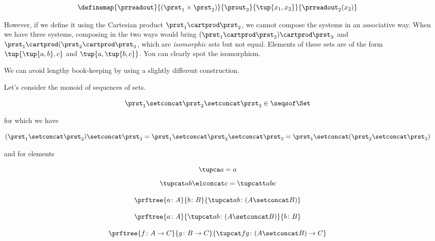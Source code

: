 \begin{equation}
  \definemap{
    \prreadout
    }{
      (\prst_1 \times \prst_2) 
    }{
      \prout_2
    }{
      \tup{x_1, x_2}
    }{
      \prreadout_2(x_2)
    }
\end{equation}

However, if we define it using the Cartesian product $\prst_1 \cartprod \prst_2$, we cannot compose the systems in an associative way. When we have three systems, composing in the two ways would bring
$(\prst_1 \cartprod \prst_2) \cartprod \prst_3$ and 
$\prst_1 \cartprod (\prst_2 \cartprod \prst_3$, which are \emph{isomorphic} sets but not equal.
Elements of these sets are of the form $\tup{\tup{a,b},c}$ and 
$\tup{a, \tup{b,c}}$. You can clearly spot the isomorphism. 

We can avoid lengthy book-keeping by using a slightly different construction. 

Let's consider the monoid of sequences of sets.

\begin{equation}
\prst_1 \setconcat \prst_2 \setconcat \prst_3 \in \seqsof\Set
\end{equation}

for which we have 

\begin{equation}
  (\prst_1 \setconcat \prst_2 )\setconcat \prst_3 =
  \prst_1 \setconcat \prst_2 \setconcat \prst_3 =
  \prst_1 \setconcat (\prst_2 \setconcat \prst_3)
\end{equation}
  
and for elements 

\begin{equation}
  \tupca a   = a
\end{equation}
\begin{equation}
   \tupcat a b \elconcat c = \tupcatt a b c
\end{equation}

\begin{equation}
  \prftree{a \colon A}{b \colon B}{ \tupcat a b \colon (A \setconcat B) }
\end{equation}
  
\begin{equation}
  \prftree{a \colon A}{ \tupcat a b \colon (A \setconcat B) }{  b \colon  B }
\end{equation}
  

\begin{equation}
  \prftree{ f \colon A \to C}{ g \colon B \to C}{ \tupcat f g \colon (A\setconcat B)\to C }
\end{equation}


